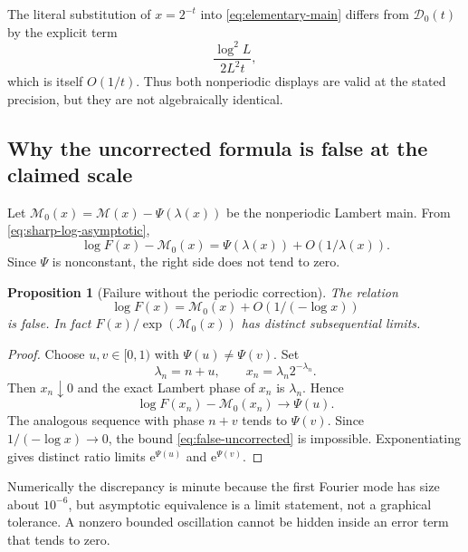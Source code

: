 \documentclass[11pt,oneside]{article}
\newtheorem{proposition}[theorem]{Proposition}
\theoremstyle{definition}
\theoremstyle{remark}
\newcommand{\e}{\mathrm e}
\begin{document}
The literal substitution of $x=2^{-t}$ into \eqref{eq:elementary-main} differs from
$\mathcal D_0(t)$ by the explicit term
\begin{equation}
 \frac{\log^2L}{2L^2t},                                   \label{eq:literal-dyadic-difference}
\end{equation}
which is itself $O(1/t)$.  Thus both nonperiodic displays are valid at the stated precision,
but they are not algebraically identical.

\subsection{Why the uncorrected formula is false at the claimed scale}

Let $\mathcal M_0(x)=\mathcal M(x)-\Psi(\lambda(x))$ be the nonperiodic Lambert main.  From
\eqref{eq:sharp-log-asymptotic},
\begin{equation}
 \log F(x)-\mathcal M_0(x)=\Psi(\lambda(x))+O(1/\lambda(x)). \label{eq:uncorrected-residual}
\end{equation}
Since $\Psi$ is nonconstant, the right side does not tend to zero.

\begin{proposition}[Failure without the periodic correction]
The relation
\begin{equation}
 \log F(x)=\mathcal M_0(x)+O(1/(-\log x))                  \label{eq:false-uncorrected}
\end{equation}
 is false.  In fact $F(x)/\exp(\mathcal M_0(x))$ has distinct subsequential limits.
\end{proposition}

\begin{proof}
Choose $u,v\in[0,1)$ with $\Psi(u)\ne\Psi(v)$.  Set
\begin{equation*}
 \lambda_n=n+u,
 \qquad x_n=\lambda_n2^{-\lambda_n}.
\end{equation*}
Then $x_n\downarrow0$ and the exact Lambert phase of $x_n$ is $\lambda_n$.  Hence
\begin{equation*}
 \log F(x_n)-\mathcal M_0(x_n)\longrightarrow\Psi(u).
\end{equation*}
The analogous sequence with phase $n+v$ tends to $\Psi(v)$.  Since
$1/(-\log x)\to0$, the bound \eqref{eq:false-uncorrected} is impossible.  Exponentiating
gives distinct ratio limits $\e^{\Psi(u)}$ and $\e^{\Psi(v)}$.
\end{proof}

Numerically the discrepancy is minute because the first Fourier mode has size about
$10^{-6}$, but asymptotic equivalence is a limit statement, not a graphical tolerance.  A
nonzero bounded oscillation cannot be hidden inside an error term that tends to zero.
\end{document}
